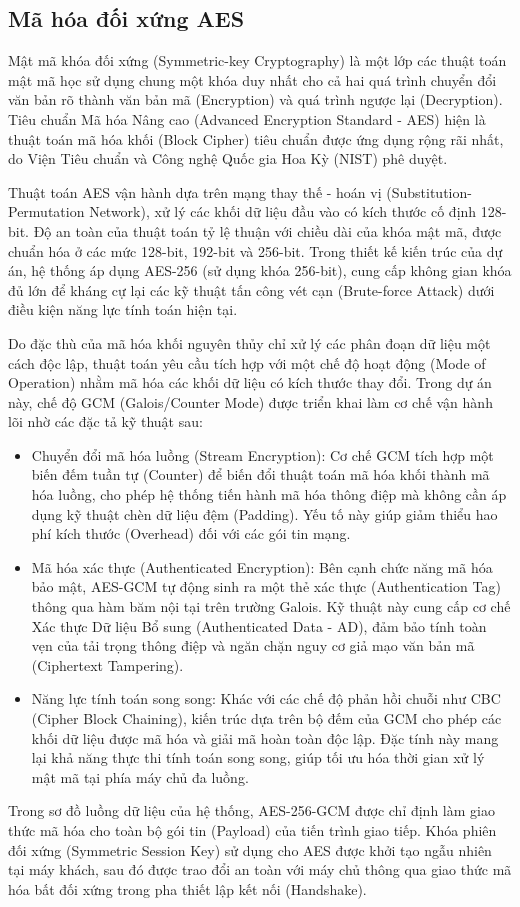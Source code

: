 \subsection{Mã hóa đối xứng AES}

Mật mã khóa đối xứng (Symmetric-key Cryptography) là một lớp các thuật toán mật mã học sử dụng chung một khóa duy nhất cho cả hai quá trình chuyển đổi văn bản rõ thành văn bản mã (Encryption) và quá trình ngược lại (Decryption). Tiêu chuẩn Mã hóa Nâng cao (Advanced Encryption Standard - AES) hiện là thuật toán mã hóa khối (Block Cipher) tiêu chuẩn được ứng dụng rộng rãi nhất, do Viện Tiêu chuẩn và Công nghệ Quốc gia Hoa Kỳ (NIST) phê duyệt.

Thuật toán AES vận hành dựa trên mạng thay thế - hoán vị (Substitution-Permutation Network), xử lý các khối dữ liệu đầu vào có kích thước cố định 128-bit. Độ an toàn của thuật toán tỷ lệ thuận với chiều dài của khóa mật mã, được chuẩn hóa ở các mức 128-bit, 192-bit và 256-bit. Trong thiết kế kiến trúc của dự án, hệ thống áp dụng AES-256 (sử dụng khóa 256-bit), cung cấp không gian khóa đủ lớn để kháng cự lại các kỹ thuật tấn công vét cạn (Brute-force Attack) dưới điều kiện năng lực tính toán hiện tại.

Do đặc thù của mã hóa khối nguyên thủy chỉ xử lý các phân đoạn dữ liệu một cách độc lập, thuật toán yêu cầu tích hợp với một chế độ hoạt động (Mode of Operation) nhằm mã hóa các khối dữ liệu có kích thước thay đổi. Trong dự án này, chế độ GCM (Galois/Counter Mode) được triển khai làm cơ chế vận hành lõi nhờ các đặc tả kỹ thuật sau:
\begin{itemize}[label={-}]
    \item Chuyển đổi mã hóa luồng (Stream Encryption): Cơ chế GCM tích hợp một biến đếm tuần tự (Counter) để biến đổi thuật toán mã hóa khối thành mã hóa luồng, cho phép hệ thống tiến hành mã hóa thông điệp mà không cần áp dụng kỹ thuật chèn dữ liệu đệm (Padding). Yếu tố này giúp giảm thiểu hao phí kích thước (Overhead) đối với các gói tin mạng.
    \item Mã hóa xác thực (Authenticated Encryption): Bên cạnh chức năng mã hóa bảo mật, AES-GCM tự động sinh ra một thẻ xác thực (Authentication Tag) thông qua hàm băm nội tại trên trường Galois. Kỹ thuật này cung cấp cơ chế Xác thực Dữ liệu Bổ sung (Authenticated Data - AD), đảm bảo tính toàn vẹn của tải trọng thông điệp và ngăn chặn nguy cơ giả mạo văn bản mã (Ciphertext Tampering).
    \item Năng lực tính toán song song: Khác với các chế độ phản hồi chuỗi như CBC (Cipher Block Chaining), kiến trúc dựa trên bộ đếm của GCM cho phép các khối dữ liệu được mã hóa và giải mã hoàn toàn độc lập. Đặc tính này mang lại khả năng thực thi tính toán song song, giúp tối ưu hóa thời gian xử lý mật mã tại phía máy chủ đa luồng.
\end{itemize}

Trong sơ đồ luồng dữ liệu của hệ thống, AES-256-GCM được chỉ định làm giao thức mã hóa cho toàn bộ gói tin (Payload) của tiến trình giao tiếp. Khóa phiên đối xứng (Symmetric Session Key) sử dụng cho AES được khởi tạo ngẫu nhiên tại máy khách, sau đó được trao đổi an toàn với máy chủ thông qua giao thức mã hóa bất đối xứng trong pha thiết lập kết nối (Handshake).

